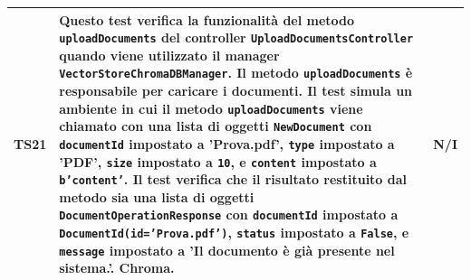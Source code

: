 \documentclass[10pt, a4paper]{article}
\begin{document}
\begin{xltabular}{\textwidth}{p{0.12\textwidth}|X|p{0.12\textwidth}}
    \hline
    TS21 & Questo test verifica la funzionalità del metodo \texttt{uploadDocuments} del controller \texttt{UploadDocumentsController} quando viene utilizzato il manager \texttt{VectorStoreChromaDBManager}. Il metodo \texttt{uploadDocuments} è responsabile per caricare i documenti. Il test simula un ambiente in cui il metodo \texttt{uploadDocuments} viene chiamato con una lista di oggetti \texttt{NewDocument} con \texttt{documentId} impostato a 'Prova.pdf', \texttt{type} impostato a 'PDF', \texttt{size} impostato a \texttt{10}, e \texttt{content} impostato a \texttt{b'content'}. Il test verifica che il risultato restituito dal metodo sia una lista di oggetti \texttt{DocumentOperationResponse} con \texttt{documentId} impostato a \texttt{DocumentId(id='Prova.pdf')}, \texttt{status} impostato a \texttt{False}, e \texttt{message} impostato a 'Il documento è già presente nel sistema.'. Chroma. & N/I \\
    \hline
\end{xltabular}



    
\end{document}

